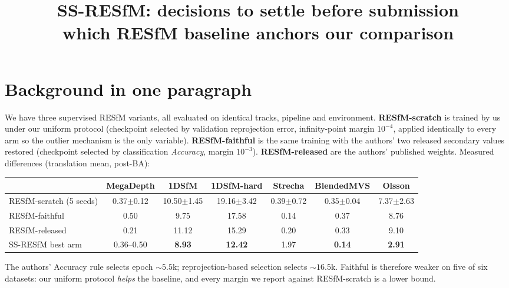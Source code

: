 \documentclass[11pt,letterpaper]{article}
\title{\vspace{-1.5cm}SS-RESfM: decisions to settle before submission\\\large which RESfM baseline anchors our comparison}
\author{}\date{}
\begin{document}
\maketitle\vspace{-1.2cm}

\section*{Background in one paragraph}
We have three supervised RESfM variants, all evaluated on identical tracks, pipeline and
environment. \textbf{RESfM-scratch} is trained by us under our uniform protocol (checkpoint
selected by validation reprojection error, infinity-point margin $10^{-4}$, applied identically to
every arm so the outlier mechanism is the only variable). \textbf{RESfM-faithful} is the same
training with the authors' two released secondary values restored (checkpoint selected by
classification \emph{Accuracy}, margin $10^{-3}$). \textbf{RESfM-released} are the authors'
published weights. Measured differences (translation mean, post-BA):

\begin{center}\footnotesize
\begin{tabular}{lcccccc}
\toprule
 & MegaDepth & 1DSfM & 1DSfM-hard & Strecha & BlendedMVS & Olsson\\
\midrule
RESfM-scratch (5 seeds) & 0.37$\pm$0.12 & 10.50$\pm$1.45 & 19.16$\pm$3.42 & 0.39$\pm$0.72 & 0.35$\pm$0.04 & 7.37$\pm$2.63\\
RESfM-faithful          & 0.50 & 9.75 & 17.58 & 0.14 & 0.37 & 8.76\\
RESfM-released          & 0.21 & 11.12 & 15.29 & 0.20 & 0.33 & 9.10\\
\midrule
SS-RESfM best arm       & 0.36--0.50 & \textbf{8.93} & \textbf{12.42} & 1.97 & \textbf{0.14} & \textbf{2.91}\\
\bottomrule
\end{tabular}
\end{center}

\noindent The authors' Accuracy rule selects epoch ${\sim}5.5$k; reprojection-based selection
selects ${\sim}16.5$k. Faithful is therefore weaker on five of six datasets: our uniform protocol
\emph{helps} the baseline, and every margin we report against RESfM-scratch is a lower bound.
\end{document}
